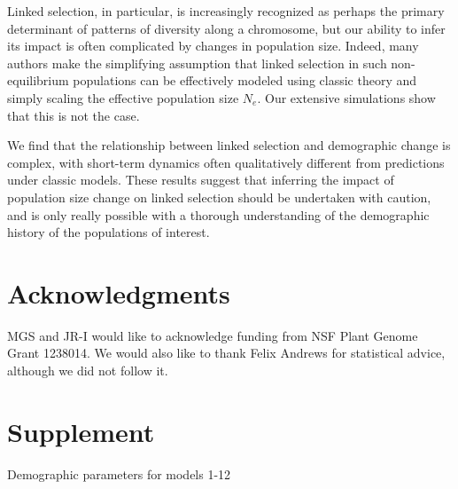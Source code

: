 \documentclass[9pt,twocolumn,twoside]{rilabRxiv}
\newcommand{\beginsupplement}{%
        \setcounter{table}{0}
        \renewcommand{\thetable}{S\arabic{table}}%
        \setcounter{figure}{0}
        \renewcommand{\thefigure}{S\arabic{figure}}%
     }
\begin{document}
Linked selection, in particular, is increasingly recognized as perhaps the primary determinant of patterns of diversity along a chromosome, but our ability to infer its impact is often complicated by changes in population size.
Indeed, many authors make the simplifying assumption that linked selection in such non-equilibrium populations can be effectively modeled using classic theory and simply scaling the  effective population size $N_e$.
Our extensive simulations show that this is not the case.

We find that the relationship between linked selection and demographic change is complex, with short-term dynamics often qualitatively different from predictions under classic models.
These results suggest that inferring the impact of population size change on linked selection should be undertaken with caution, and is only really possible with a thorough understanding of the demographic history of the populations of interest.

\section{Acknowledgments}

MGS and JR-I would like to acknowledge funding from NSF Plant Genome Grant 1238014.
We would also like to thank Felix Andrews for statistical advice, although we did not follow it.



\onecolumn

\beginsupplement
\section*{Supplement}

\begin{table}

\caption{Demographic parameters for models 1-12}
\label{table:params}
\end{table}
\pagebreak
\end{document}
